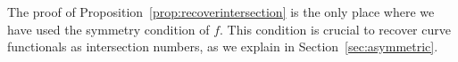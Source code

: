 The proof of Proposition~\ref{prop:recoverintersection} is the only place where we have used the symmetry condition of $f$. This condition is crucial to recover curve functionals as intersection numbers, as we explain in Section~\ref{sec:asymmetric}.




